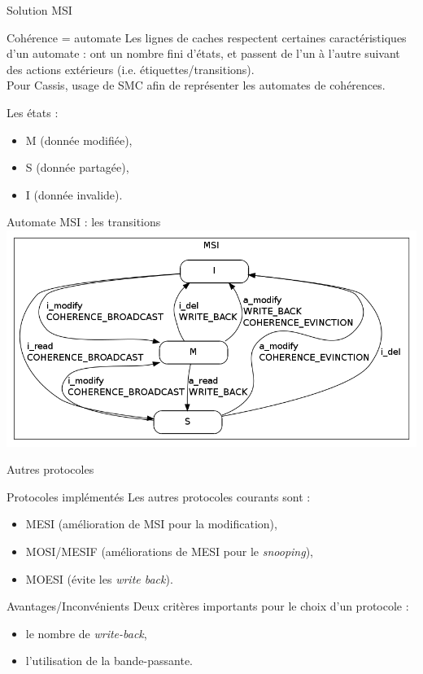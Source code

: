 \begin{frame}{Solution MSI}
  \begin{block}{Cohérence = automate}
    Les lignes de caches respectent certaines caractéristiques d'un automate : ont un nombre fini d'états, et passent de l'un à l'autre suivant des actions extérieurs (i.e. étiquettes/transitions).\\
    Pour \textsf{Cassis}, usage de \textsf{SMC} afin de représenter les automates de cohérences.
  \end{block}
  
  \begin{block}{Les états :}
    \begin{itemize}
    \item{M (donnée modifiée),}
    \item{S (donnée partagée),}
    \item{I (donnée invalide).}
    \end{itemize}
  \end{block}
\end{frame}

\begin{frame}{Automate MSI : les transitions}
    \includegraphics[scale=.4]{images/MSI_simple.png}
\end{frame}

\begin{frame}{Autres protocoles}
  \begin{block}{Protocoles implémentés}
    Les autres protocoles courants sont :
    \begin{itemize}
    \item{MESI (amélioration de MSI pour la modification),}
    \item{MOSI/MESIF (améliorations de MESI pour le \emph{snooping}),}
    \item{MOESI (évite les \emph{write back}).}
    \end{itemize}
  \end{block}
  
  \begin{block}{Avantages/Inconvénients}
    Deux critères importants pour le choix d'un protocole :
    \begin{itemize}
    \item{le nombre de \emph{write-back},}
    \item{l'utilisation de la bande-passante.}
    \end{itemize}
  \end{block}
\end{frame}

